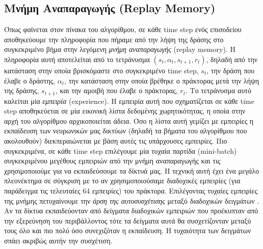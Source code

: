 \documentclass[11pt]{article} %
\numberwithin{equation}{subsection}
\begin{document}
\subsection{Μνήμη Αναπαραγωγής (Replay Memory)}

Όπως φαίνεται στον πίνακα του αλγορίθμου, σε κάθε time step ενός επισοδείου αποθηκεύουμε την πληροφορία που πήραμε από την λήψη της δράσης στο συγκεκριμένο βήμα στην λεγόμενη \textit{μνήμη αναπαραγωγής} (replay memory). Η πληροφορία αυτή αποτελείται από το τετράνυσμα $(s_t, \alpha_t, s_{t + 1}, r_t)$, δηλαδή από την κατάσταση στην οποία βρισκόμαστε στο συγκεκριμένο time step, $s_t$, την δράση που έλαβε ο δράστης, $\alpha_t$, την κατάσταση στην οποία βρέθηκε ο πράκτορας μετά την λήψη της δράσης, $s_{t + 1}$, και την αμοιβή που έλαβε ο πράκτορας, $r_t$. Το τετράνυσμα αυτό καλείται μία \textit{εμπειρία} (experience). Η εμπειρία αυτή που σχηματίζεται σε κάθε time step αποθηκεύεται σε μία εικονική λίστα δεδομένης χωρητικότητας, η οποία στην αρχή του αλγορίθμου αρχικοποιείται άδεια. Όσο η λίστα αυτή γεμίζει με εμπειρίες η εκπαίδευση των νευρωνικών μας δικτύων (δηλαδή τα βήματα του αλγορίθμου που ακολουθούν) διεκπεραιώνεται με βάση αυτές τις υπάρχουσες εμπειρίες.  Πιο συγκεκριμένα, σε κάθε time step επιλέγουμε μία τυχαία παρτίδα (mini-batch) συγκεκριμένου μεγέθους εμπειριών από την μνήμη αναπαραγωγής και τις χρησιμοποιούμε για να εκπαιδεύσουμε τα δίκτυά μας. Η τεχνική αυτή έχει ένα μεγάλο πλεονέκτημα σε σύγκριση με το αν χρησιμοποιούσαμε διαδοχικές εμπειρίες (για παράδειγμα τις τελευταίες 64 εμπειρίες) του πράκτορα. Επιλέγοντας τυχαίες εμπειρίες της μνήμης πετυχαίνουμε την \textit{άρση της αυτοσυσχέτισης} μεταξύ διαδοχικών δειγμάτων \cite{replaymemory}. Αν τα δίκτυα εκπαιδεύονταν από δείγματα διαδοχικών εμπειριών που προέκυπταν από την εξερεύνηση του περιβάλλοντος τότε τα δείγματα αυτά θα συσχετίζονταν μεταξύ τους όλο και πιο πολύ όσο συνεχιζόταν η εκπαίδευση. Η τυχαιότητα των δειγμάτων σπάει ακριβώς αυτήν την συσχέτιση.\\
\end{document}
